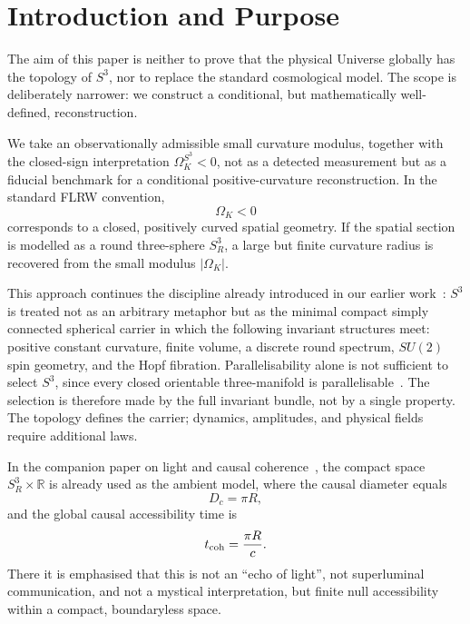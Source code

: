 \documentclass[aps,prd,onecolumn,superscriptaddress,longbibliography,nofootinbib,notitlepage]{revtex4-2}
\newcommand{\journalrule}{\par\vspace{0.45em}{\color{JournalGold}\hrule height 0.8pt}\vspace{0.65em}}
\begin{document}
\maketitle
\journalrule

\section{Introduction and Purpose}
\label{sec:intro}

The aim of this paper is neither to prove that the physical Universe globally has
the topology of $S^3$, nor to replace the standard cosmological model. The scope
is deliberately narrower: we construct a conditional, but mathematically
well-defined, reconstruction.

We take an observationally admissible small curvature modulus, together with the
closed-sign interpretation $\Omega_K^{S^3}<0$, not as a detected measurement but
as a fiducial benchmark for a conditional positive-curvature reconstruction. In
the standard FLRW convention,
\begin{equation}
  \Omega_K < 0
\end{equation}
corresponds to a closed, positively curved spatial geometry. If the spatial
section is modelled as a round three-sphere $S^3_R$, a large but finite curvature
radius is recovered from the small modulus $|\Omega_K|$.

This approach continues the discipline already introduced in our earlier
work~\cite{Preece2026causal}: $S^3$ is treated not as an arbitrary metaphor but
as the minimal compact simply connected spherical carrier in which the following
invariant structures meet: positive constant curvature, finite volume, a discrete
round spectrum, $SU(2)$ spin geometry, and the Hopf fibration. Parallelisability
alone is not sufficient to select $S^3$, since every closed orientable
three-manifold is parallelisable~\cite{BenedettiLisca2018}. The selection is
therefore made by the full invariant bundle, not by a single property. The
topology defines the carrier; dynamics, amplitudes, and physical fields require
additional laws.

In the companion paper on light and causal coherence~\cite{Preece2026causal},
the compact space $S^3_R \times \mathbb{R}$ is already used as the ambient model,
where the causal diameter equals
\begin{equation}
  D_c = \pi R,
\end{equation}
and the global causal accessibility time is
\begin{equation}
  t_{\rm coh} = \frac{\pi R}{c}.
\end{equation}
There it is emphasised that this is not an ``echo of light'', not superluminal
communication, and not a mystical interpretation, but finite null accessibility
within a compact, boundaryless space.
\end{document}
